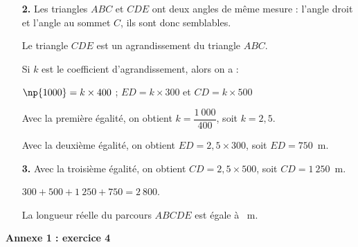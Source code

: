 \documentclass[10pt]{article}
\begin{document}
\begin{enumerate}
\item[\textbf{2.}] Les triangles $ABC$ et $CDE$ ont deux angles de même mesure : l’angle droit et l’angle au sommet $C$, ils sont donc semblables.

Le triangle $CDE$ est un agrandissement du triangle $ABC$.

Si $k$ est le coefficient d’agrandissement, alors on a :

$\np{1000}=k\times 400$ \hspace{1cm} ; \hspace{1cm} $ED=k\times 300$ \hspace{1cm} et \hspace{1cm} $CD=k\times 500$

Avec la première égalité, on obtient $k=\dfrac{1~000}{400}$, soit $k=2,5$.

Avec la deuxième égalité, on obtient $ED=2,5\times 300$, soit $ED=750$~m. 
\item[\textbf{3.}] Avec la troisième égalité, on obtient $CD=2,5\times 500$, soit $CD=1~250$~m. 

$300+500+1~250+750=2~800$.

La longueur réelle du parcours $ABCDE$ est égale à ~m.
\end{enumerate}

\newpage

\begin{center}
{\Large \textbf{Annexe 1 : exercice 4}}

\vspace{3cm}

\begin{scratch}
\end{scratch}

\end{center}
\newpage
\end{document}
